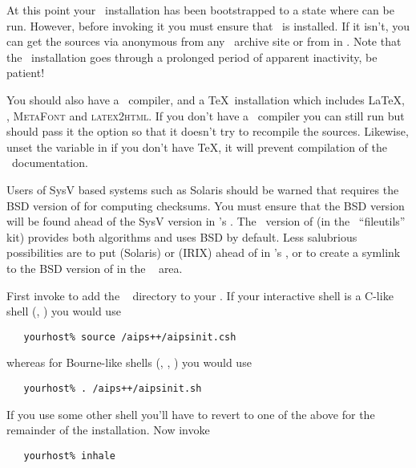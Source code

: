 At this point your \aipspp\ installation has been bootstrapped to a state
where  can be run.  However, before invoking it you must ensure
that \rcs\ is installed.  If it isn't, you can get the sources via anonymous
 from any \gnu\ archive site or from  in
.  Note that the \rcs\ installation goes through a prolonged
period of apparent inactivity, be patient!

You should also have a \cplusplus\ compiler, and a \TeX\ installation which
includes \LaTeX, , \textsc{MetaFont} and \textsc{latex2html}.
If you don't have a \cplusplus\ compiler you can still run  but
should pass it the  option so that it doesn't try to recompile the
sources.  Likewise, unset the  variable in  if you
don't have \TeX, it will prevent compilation of the \aipspp\ documentation.

Users of SysV based systems such as Solaris should be warned that
 requires the BSD version of  for computing
checksums.  You must ensure that the BSD version will be found ahead of the
SysV version in 's .  The \gnu\ version of
 (in the \gnu\ ``fileutils'' kit) provides both algorithms and
uses BSD by default.  Less salubrious possibilities are to put 
(Solaris) or  (IRIX) ahead of  in
's , or to create a symlink to the BSD version of
 in the \aipspp\  area.  

First invoke  to add the \aipspp\  directory to
your .  If your interactive shell is a C-like shell (,
) you would use

\begin{verbatim}
   yourhost% source /aips++/aipsinit.csh
\end{verbatim}

\noindent
whereas for Bourne-like shells (, , )
you would use

\begin{verbatim}
   yourhost% . /aips++/aipsinit.sh
\end{verbatim}

\noindent
If you use some other shell you'll have to revert to one of the above for the
remainder of the installation.  Now invoke 

\begin{verbatim}
   yourhost% inhale
\end{verbatim}

